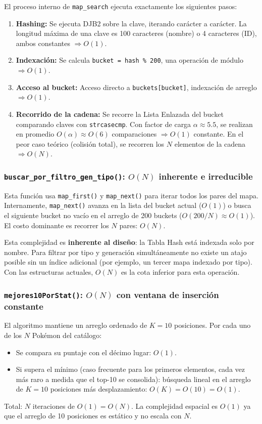 \documentclass[12pt, letterpaper]{article}
\begin{document}
El proceso interno de \texttt{map\_search} ejecuta exactamente los siguientes pasos:
\begin{enumerate}
    \item \textbf{Hashing:} Se ejecuta DJB2 sobre la clave, iterando carácter a carácter. La longitud máxima de una clave es 100 caracteres (nombre) o 4 caracteres (ID), ambos constantes $\Rightarrow O(1)$.
    \item \textbf{Indexación:} Se calcula \texttt{bucket = hash \% 200}, una operación de módulo $\Rightarrow O(1)$.
    \item \textbf{Acceso al bucket:} Acceso directo a \texttt{buckets[bucket]}, indexación de arreglo $\Rightarrow O(1)$.
    \item \textbf{Recorrido de la cadena:} Se recorre la Lista Enlazada del bucket comparando claves con \texttt{strcasecmp}. Con factor de carga $\alpha \approx 5.5$, se realizan en promedio $O(\alpha) \approx O(6)$ comparaciones $\Rightarrow O(1)$ constante. En el peor caso teórico (colisión total), se recorren los $N$ elementos de la cadena $\Rightarrow O(N)$.
\end{enumerate}

\subsubsection{\texttt{buscar\_por\_filtro\_gen\_tipo()}: $O(N)$ inherente e irreducible}

Esta función usa \texttt{map\_first()} y \texttt{map\_next()} para iterar todos los pares del mapa. Internamente, \texttt{map\_next()} avanza en la lista del bucket actual ($O(1)$) o busca el siguiente bucket no vacío en el arreglo de 200 buckets ($O(200/N) \approx O(1)$). El costo dominante es recorrer los $N$ pares: $O(N)$.

Esta complejidad es \textbf{inherente al diseño}: la Tabla Hash está indexada solo por nombre. Para filtrar por tipo y generación simultáneamente no existe un atajo posible sin un índice adicional (por ejemplo, un tercer mapa indexado por tipo). Con las estructuras actuales, $O(N)$ es la cota inferior para esta operación.

\subsubsection{\texttt{mejores10PorStat()}: $O(N)$ con ventana de inserción constante}

El algoritmo mantiene un arreglo ordenado de $K=10$ posiciones. Por cada uno de los $N$ Pokémon del catálogo:
\begin{itemize}
    \item Se compara su puntaje con el décimo lugar: $O(1)$.
    \item Si supera el mínimo (caso frecuente para los primeros elementos, cada vez más raro a medida que el top-10 se consolida): búsqueda lineal en el arreglo de $K=10$ posiciones más desplazamiento: $O(K) = O(10) = O(1)$.
\end{itemize}
Total: $N$ iteraciones de $O(1) = O(N)$. La complejidad espacial es $O(1)$ ya que el arreglo de 10 posiciones es estático y no escala con $N$.
\end{document}
